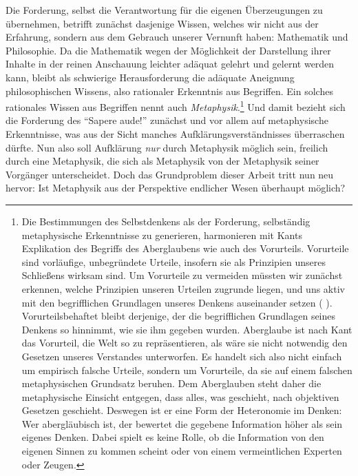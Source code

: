 Die Forderung, selbst die Verantwortung für die eigenen Überzeugungen zu
übernehmen, betrifft zunächst dasjenige Wissen, welches wir nicht aus der
Erfahrung, sondern aus dem Gebrauch unserer Vernunft haben: Mathematik und
Philosophie. Da die Mathematik wegen der Möglichkeit der Darstellung ihrer
Inhalte in der reinen Anschauung leichter adäquat gelehrt und gelernt werden
kann, bleibt als schwierige Herausforderung die adäquate Aneignung
philosophischen Wissens, also rationaler Erkenntnis aus Begriffen. Ein solches
rationales Wissen aus Begriffen nennt  auch
\emph{Metaphysik}.\footnote{Die Bestimmungen des Selbstdenkens als der Forderung, selbständig metaphysische
Erkenntnisse zu generieren, harmonieren mit Kants Explikation des Begriffs des
Aberglaubens wie auch des Vorurteils. Vorurteile sind vorläufige, unbegründete
Urteile, insofern sie als Prinzipien unseres Schließens wirksam sind. Um
Vorurteile zu vermeiden müssten wir zunächst erkennen, welche Prinzipien unseren
Urteilen zugrunde liegen, und uns aktiv mit den begrifflichen Grundlagen unseres
Denkens auseinander
setzen \mkbibparens{\cite[vgl.][A~116\,f.,]{Kant:ImmanuelKantsLogik1977}
\cite[][IX: 75.24--76.12]{Kant:GesammelteWerke1900ff.}}. Vorurteilsbehaftet
bleibt derjenige, der die begrifflichen Grundlagen seines Denkens so hinnimmt, wie sie ihm gegeben wurden.
Aberglaube ist nach Kant das Vorurteil, die Welt so zu repräsentieren, als wäre
sie nicht notwendig den Gesetzen unseres Verstandes unterworfen. Es handelt sich
also nicht einfach um empirisch falsche Urteile, sondern um Vorurteile, da sie
auf einem falschen metaphysischen Grundsatz beruhen. Dem Aberglauben steht daher
die metaphysische Einsicht entgegen, dass alles, was geschieht, nach objektiven
Gesetzen geschieht. Deswegen ist er eine Form der Heteronomie im Denken: Wer
abergläubisch ist, der bewertet die gegebene Information höher als sein eigenes
Denken. Dabei spielt es keine Rolle, ob die Information von den eigenen Sinnen
zu kommen scheint oder von einem vermeintlichen Experten oder Zeugen.} Und damit bezieht sich die Forderung des
\enquote{Sapere aude!} zunächst und vor allem auf metaphysische Erkenntnisse, was aus der Sicht
manches Aufklärungsverständnisses überraschen dürfte. Nun also soll Aufklärung
\emph{nur} durch Metaphysik möglich sein, freilich durch eine Metaphysik, die
sich als  Metaphysik von der Metaphysik seiner Vorgänger
unterscheidet. Doch das Grundproblem dieser Arbeit tritt nun neu hervor: Ist
Metaphysik aus der Perspektive endlicher Wesen überhaupt möglich?

